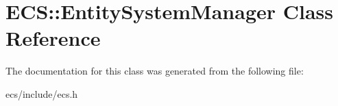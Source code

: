 \hypertarget{class_e_c_s_1_1_entity_system_manager}{\section{E\-C\-S\-:\-:Entity\-System\-Manager Class Reference}
\label{class_e_c_s_1_1_entity_system_manager}
}


The documentation for this class was generated from the following file\-:\begin{DoxyCompactItemize}
\item 
ecs/include/ecs.\-h\end{DoxyCompactItemize}

